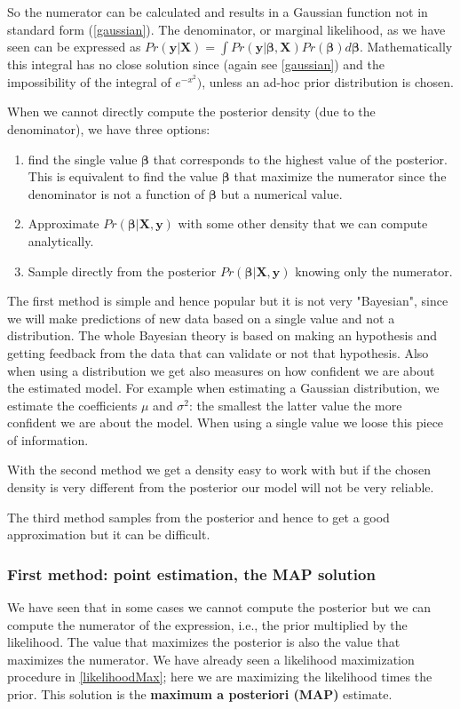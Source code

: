\documentclass[12pt, letterpaper]{article}
\theoremstyle{definition}
\newcommand{\X}{\mathrm{\mathbf{X}}}
\newcommand{\y}{\mathbf{y}}
\newcommand{\be}{\mathbf{\beta}}
\begin{document}
So the numerator can be calculated and results in a Gaussian function not in standard form (\ref{gaussian}). The denominator, or marginal likelihood, as we have seen can be expressed as $Pr(\y|\X) = \int Pr\left(\y|\be,\X\right) Pr(\be) d\be$. Mathematically this integral has no close solution since (again see \ref{gaussian}) and the impossibility of the integral of $e^{-x^2})$, unless an ad-hoc prior distribution is chosen.

When we cannot directly compute the posterior density (due to the denominator), we have three options:
\begin{enumerate}
\item find the single value $\be$ that corresponds to the highest value of the posterior. This is equivalent to find the value $\be$ that maximize the numerator since the denominator is not a function of $\be$ but a numerical value.
\item Approximate $Pr(\be|\X, \y)$ with some other density that we can compute analytically.
\item Sample directly from the posterior $Pr(\be|\X,\y)$ knowing only the numerator.
\end{enumerate}

The first method is simple and hence popular but it is not very "Bayesian", since we will make predictions of new data based on a single value and not a distribution. The whole Bayesian theory is based on making an hypothesis and getting feedback from the data that can validate or not that hypothesis. Also when using a distribution we get also measures on how confident we are about the estimated model. For example when estimating a Gaussian distribution, we estimate the coefficients $\mu$ and $\sigma^2$: the smallest the latter value the more confident we are about the model. When using a single value we loose this piece of information.

With the second method we get a density easy to work with but if the chosen density is very different from the posterior our model will not be very reliable.

The third method samples from the posterior and hence to get a good approximation but it can be difficult.

\subsubsection{First method: point estimation, the MAP solution}
We have seen that in some cases we cannot compute the posterior but we can compute the numerator of the expression, i.e., the prior multiplied by the likelihood. The value that maximizes the posterior is also the value that maximizes the numerator. We have already seen a likelihood maximization procedure in \ref{likelihoodMax}; here we are maximizing the likelihood times the prior. This solution is the \textbf{maximum a posteriori (MAP)} estimate.
\end{document}

